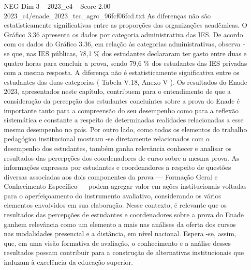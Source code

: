 \begin{textsample}{NEG Dim 3 – 2023\_c4 – Score 2.00 – 2023\_c4/enade\_2023\_tec\_agro\_96fcf06fcd.txt}
As diferenças não são estatisticamente significativas entre as proporções das organizações acadêmicas.
O Gráfico 3.36 apresenta os dados por categoria administrativa das IES.
De acordo com os dados do Gráfico 3.36, em relação às categorias administrativas, observa -se que, nas IES públicas, 78,1 \% dos estudantes declararam ter gasto entre duas e quatro horas para concluir a prova, sendo 79,6 \% dos estudantes das IES privadas com a mesma resposta.
A diferença não é estatisticamente significativa entre os estudantes das duas categorias ( Tabela V.18, Anexo V ).
Os resultados do Enade 2023, apresentados neste capítulo, contribuem para o entendimento de que a consideração da percepção dos estudantes concluintes sobre a prova do Enade é importante tanto para a compreensão do seu desempenho como para a reflexão sistemática e constante a respeito de determinadas realidades relacionadas a esse mesmo desempenho no país.
Por outro lado, como todos os elementos do trabalho pedagógico institucional mostram -se diretamente relacionados com o desempenho dos estudantes, também ganha relevância conhecer e analisar os resultados das percepções dos coordenadores de curso sobre a mesma prova.
As informações expressas por estudantes e coordenadores a respeito de questões diversas associadas aos dois componentes da prova — Formação Geral e Conhecimento Específico — podem agregar valor em ações institucionais voltadas para o aperfeiçoamento do instrumento avaliativo, considerando os vários elementos envolvidos em sua elaboração.
Nesse contexto, é relevante que os resultados das percepções de estudantes e coordenadores sobre a prova do Enade ganhem relevância como um elemento a mais nas análises da oferta dos cursos nas modalidades presencial e a distância, em nível nacional.
Espera -se, assim, que, em uma visão formativa de avaliação, o conhecimento e a análise desses resultados possam contribuir para a construção de alternativas institucionais que induzam à excelência da educação superior.

\end{textsample}
